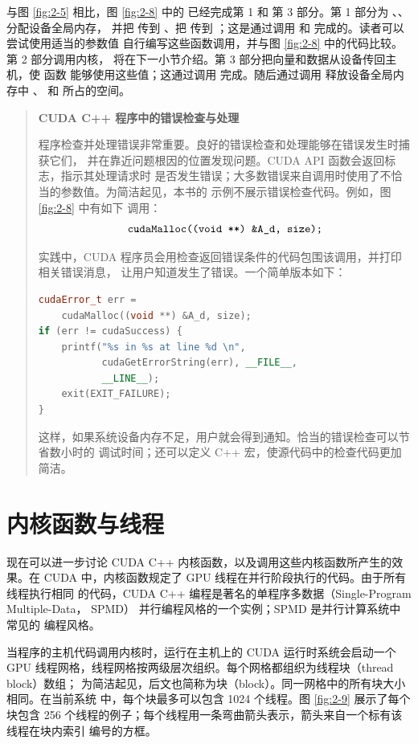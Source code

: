 与图 \ref{fig:2-5} 相比，图 \ref{fig:2-8} 中的  已经完成第 1 和
第 3 部分。第 1 部分为 、、 分配设备全局内存，
并把  传到 、把  传到 ；这是通过调用
 和  完成的。读者可以尝试使用适当的参数值
自行编写这些函数调用，并与图 \ref{fig:2-8} 中的代码比较。第 2 部分调用内核，
将在下一小节介绍。第 3 部分把向量和数据从设备传回主机，使  函数
能够使用这些值；这通过调用  完成。随后通过调用 
释放设备全局内存中 、 和  所占的空间。

\begin{quote}
\textbf{CUDA C++ 程序中的错误检查与处理}

程序检查并处理错误非常重要。良好的错误检查和处理能够在错误发生时捕获它们，
并在靠近问题根因的位置发现问题。CUDA API 函数会返回标志，指示其处理请求时
是否发生错误；大多数错误来自调用时使用了不恰当的参数值。为简洁起见，本书的
示例不展示错误检查代码。例如，图 \ref{fig:2-8} 中有如下 
调用：
\[
\code{cudaMalloc((void **) &A_d, size);}
\]

实践中，CUDA 程序员会用检查返回错误条件的代码包围该调用，并打印相关错误消息，
让用户知道发生了错误。一个简单版本如下：

\begin{lstlisting}[language=C++]
cudaError_t err =
    cudaMalloc((void **) &A_d, size);
if (err != cudaSuccess) {
    printf("%s in %s at line %d \n",
           cudaGetErrorString(err), __FILE__,
           __LINE__);
    exit(EXIT_FAILURE);
}
\end{lstlisting}

这样，如果系统设备内存不足，用户就会得到通知。恰当的错误检查可以节省数小时的
调试时间；还可以定义 C++ 宏，使源代码中的检查代码更加简洁。
\end{quote}

\section{内核函数与线程}
\label{sec:kernel-functions-and-threading}

现在可以进一步讨论 CUDA C++ 内核函数，以及调用这些内核函数所产生的效果。在
CUDA 中，内核函数规定了 GPU 线程在并行阶段执行的代码。由于所有线程执行相同
的代码，CUDA C++ 编程是著名的单程序多数据（Single-Program Multiple-Data，
SPMD）\cite{atallah1998} 并行编程风格的一个实例；SPMD 是并行计算系统中常见的
编程风格。

当程序的主机代码调用内核时，运行在主机上的 CUDA 运行时系统会启动一个 GPU
线程网格，线程网格按两级层次组织。每个网格都组织为线程块（thread block）数组；
为简洁起见，后文也简称为块（block）。同一网格中的所有块大小相同。在当前系统
中，每个块最多可以包含 1024 个线程。图 \ref{fig:2-9} 展示了每个块包含 256
个线程的例子；每个线程用一条弯曲箭头表示，箭头来自一个标有该线程在块内索引
编号的方框。

